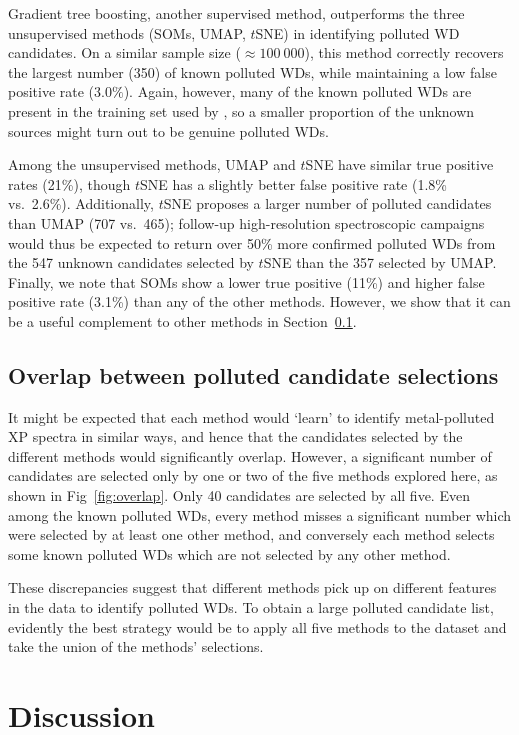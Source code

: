 \documentclass[fleqn,usenatbib]{rasti}
\begin{document}
Gradient tree boosting, another supervised method, outperforms the three unsupervised methods (SOMs, UMAP, $t$SNE) in identifying polluted WD candidates.
On a similar sample size ($\approx 100~000$), this method correctly recovers the largest number (350) of known polluted WDs, while maintaining a low false positive rate ($3.0\%$).
Again, however, many of the known polluted WDs are present in the training set used by \citet{vincent24}, so a smaller proportion of the unknown sources might turn out to be genuine polluted WDs.

Among the unsupervised methods, UMAP and $t$SNE have similar true positive rates (21\%), though $t$SNE has a slightly better false positive rate (1.8\% vs.\ 2.6\%).
Additionally, $t$SNE proposes a larger number of polluted candidates than UMAP (707 vs.\ 465); follow-up high-resolution spectroscopic campaigns would thus be expected to return over 50\% more confirmed polluted WDs from the 547 unknown candidates selected by $t$SNE than the 357 selected by UMAP.
Finally, we note that SOMs show a lower true positive (11\%) and higher false positive rate (3.1\%) than any of the other methods.
However, we show that it can be a useful complement to other methods in Section~\ref{sec:results/overlap}.


\subsection{Overlap between polluted candidate selections} \label{sec:results/overlap}

It might be expected that each method would `learn' to identify metal-polluted XP spectra in similar ways, and hence that the candidates selected by the different methods would significantly overlap.
However, a significant number of candidates are selected only by one or two of the five methods explored here, as shown in Fig~\ref{fig:overlap}.
Only 40 candidates are selected by all five.
Even among the known polluted WDs, every method misses a significant number which were selected by at least one other method, and conversely each method selects some known polluted WDs which are not selected by any other method.

These discrepancies suggest that different methods pick up on different features in the data to identify polluted WDs.
To obtain a large polluted candidate list, evidently the best strategy would be to apply all five methods to the dataset and take the union of the methods' selections.


\section{Discussion} \label{sec:discussion}
\end{document}
